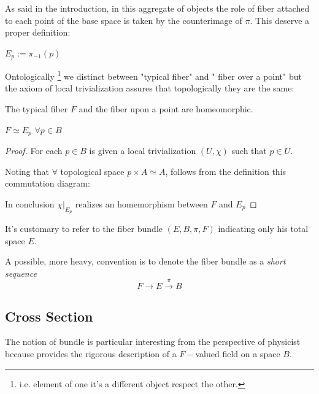 \documentclass[a4paper,12pt]{scrartcl}    %
\begin{document}
As said in the introduction, in this aggregate of objects the role of fiber attached to each point of the base space is taken by the counterimage of $\pi$. 
This deserve a proper definition:
\begin{definition}
$E_{p} := \pi_{-1}(p) $
\end{definition}

Ontologically \footnote{i.e. element of one it's a different object respect the other.} we distinct between "typical fiber" and " fiber over a point" but the axiom of local trivialization assures that topologically they are the same:

\begin{lemma}
The typical fiber $F$ and the fiber upon a point are homeomorphic.
	\begin{thesis}
		$F \simeq E_{p} $ $\forall p \in B$ 
	\end{thesis}
\end{lemma}%
\begin{proof}
For each $p\in B$ is given a local trivialization $(U, \chi)$ such that $p \in U$.

Noting that $\forall $ topological space  ${p} \times A \simeq A$, follows from the definition this commutation diagram:


In conclusion $\chi \vert _{E_{p}}$ realizes an homemorphism between $F$ and $E_{p}$

\end{proof}


\begin{notationfix}
It's customary to refer to the fiber bundle $(E,B,\pi,F)$ indicating only his total space $E$.

A possible, more heavy, convention is to denote the fiber bundle as a \emph{short sequence}
$$ F \rightarrow E \xrightarrow{\pi} B$$
\end{notationfix}


\subsection{Cross Section}
The notion of bundle is particular interesting from the perspective of physicist because provides the rigorous description of a $F-$valued field on a space $B$.
\end{document}
